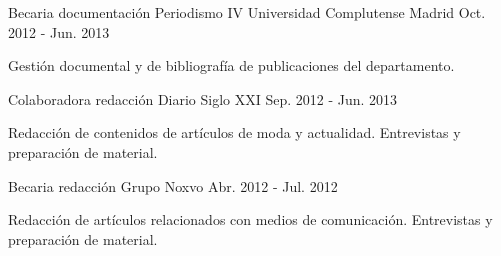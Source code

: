 \begin{cventries}
  \cventry
    {Becaria documentación Periodismo IV} %
    {Universidad Complutense Madrid} %
    {} %
    {Oct. 2012 - Jun. 2013} %
    {
      \begin{cvitems} %
        \item {Gestión documental y de bibliografía de publicaciones del departamento.}
      \end{cvitems}
    }

  \cventry
    {Colaboradora redacción} %
    {Diario Siglo XXI} %
    {} %
    {Sep. 2012 - Jun. 2013} %
    {
      \begin{cvitems} %
        \item {Redacción de contenidos de artículos de moda y actualidad. Entrevistas y preparación de material.}
      \end{cvitems}
    }

  \cventry
    {Becaria redacción} %
    {Grupo Noxvo} %
    {} %
    {Abr. 2012 - Jul. 2012} %
    {
      \begin{cvitems} %
        \item {Redacción de artículos relacionados con medios de comunicación. Entrevistas y preparación de material.}
      \end{cvitems}
    }

\end{cventries}
